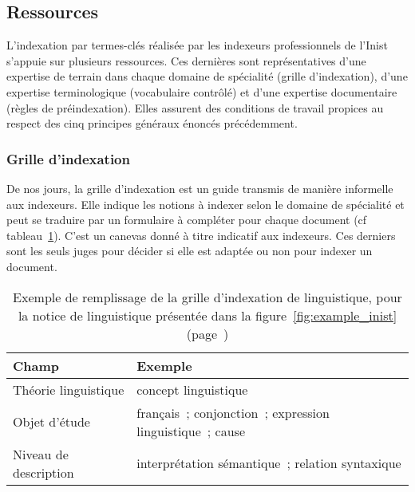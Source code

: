     \subsection{Ressources}
    \label{subsec:main-domain_specific_keyphrase_annotation-manual_keyphrase_annotation-resources}
      L'indexation par termes-clés réalisée par les indexeurs professionnels de
      l'Inist s'appuie sur plusieurs ressources. Ces dernières sont
      représentatives d'une expertise de terrain dans chaque domaine de
      spécialité (grille d'indexation), d'une expertise terminologique
      (vocabulaire contrôlé) et d'une expertise documentaire (règles de
      préindexation). Elles assurent des conditions de travail propices
      au respect des cinq principes généraux énoncés précédemment.

      \subsubsection{Grille d'indexation}
      \label{subsubsec:main-domain_specific_keyphrase_annotation-manual_keyphrase_annotation-resources-indexing_guidelines}
        De nos jours, la grille d'indexation est un guide transmis de manière
        informelle aux indexeurs. Elle indique les notions à indexer selon le
        domaine de spécialité et peut se traduire par un formulaire à compléter
        pour chaque document (cf tableau~\ref{fig:indexing_grid}). C'est un
        canevas donné à titre indicatif aux indexeurs. Ces derniers sont les
        seuls juges pour décider si elle est adaptée ou non pour indexer un
        document.
        \begin{table}[h!]
          \centering
          \begin{tabular}{l|l}
            \toprule
            \textbf{Champ} & \textbf{Exemple}\\
            \hline
            Théorie linguistique & concept linguistique\\
            Objet d'étude & français~; conjonction~; expression linguistique~; cause\\
            Niveau de description & interprétation sémantique~; relation syntaxique\\
            \bottomrule
          \end{tabular}
          \caption[
            Exemple de remplissage de la grille d'indexation de linguistique
          ]{
            Exemple de remplissage de la grille d'indexation de linguistique,
            pour la notice de linguistique présentée dans la
            figure~\ref{fig:example_inist} (page~\pageref{fig:example_inist})
            \label{fig:indexing_grid}
          }
        \end{table}

